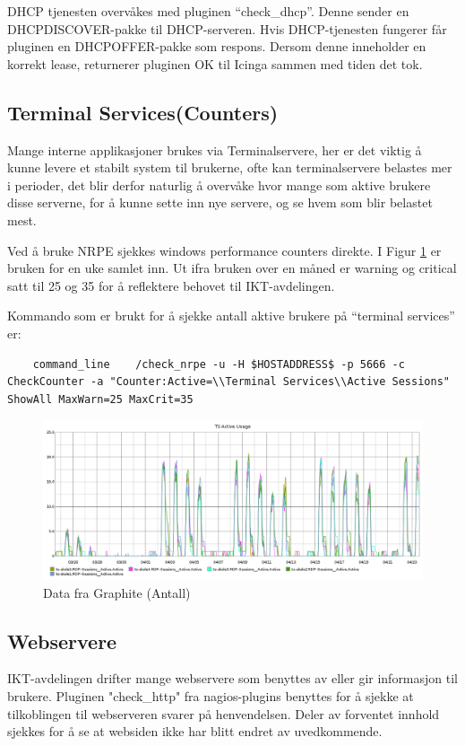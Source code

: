 DHCP tjenesten overvåkes med pluginen “check\_dhcp”. Denne sender en DHCPDISCOVER-pakke til DHCP-serveren. Hvis DHCP-tjenesten fungerer får pluginen en DHCPOFFER-pakke som respons. Dersom denne inneholder en korrekt lease, returnerer pluginen OK til Icinga sammen med tiden det tok.

\subsection{Terminal Services(Counters)}
Mange interne applikasjoner brukes via Terminalservere, her er det viktig å kunne levere et stabilt system til brukerne, ofte kan terminalservere belastes mer i perioder, det blir derfor naturlig å overvåke hvor mange som aktive brukere disse serverne, for å kunne sette inn nye servere, og se hvem som blir belastet mest.

Ved å bruke NRPE sjekkes windows performance counters direkte. I Figur \ref{ts-skole-usage} er bruken for en uke samlet inn. Ut ifra bruken over en måned er warning og critical satt til 25 og 35 for å reflektere behovet til IKT-avdelingen.

Kommando som er brukt for å sjekke antall aktive brukere på ``terminal services'' er:
 
\begin{lstlisting}
	command_line	/check_nrpe -u -H $HOSTADDRESS$ -p 5666 -c CheckCounter -a "Counter:Active=\\Terminal Services\\Active Sessions" ShowAll MaxWarn=25 MaxCrit=35
\end{lstlisting}


\begin{figure}[H]
	\centering
	\includegraphics[width=1.0\textwidth]{img/ts-skole-usage-inv}
	\caption{Data fra Graphite (Antall)}
	\label{ts-skole-usage}
\end{figure}

\subsection{Webservere}
IKT-avdelingen drifter mange webservere som benyttes av eller gir informasjon til brukere. Pluginen "check\_http" \cite{checkhttp} fra nagios-plugins benyttes for å sjekke at tilkoblingen til webserveren svarer på henvendelsen. Deler av forventet innhold sjekkes for å se at websiden ikke har blitt endret av uvedkommende.

